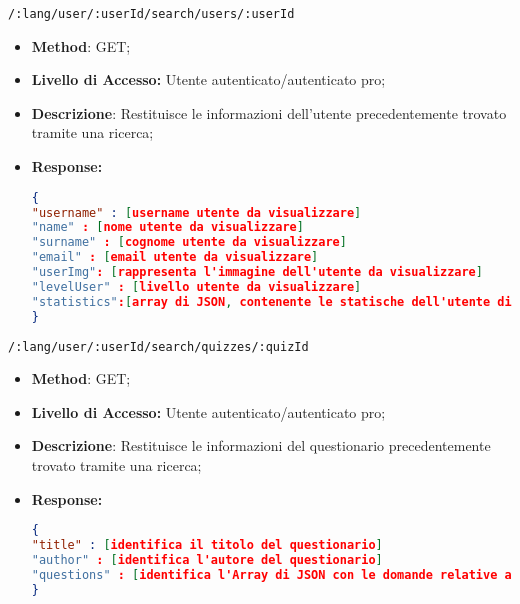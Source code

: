 	\item \texttt{/:lang/user/:userId/search/users/:userId}
	 \begin{itemize}
	 	\item \textbf{Method}: GET;
	 	\item \textbf{Livello di Accesso:} Utente autenticato/autenticato pro;
	 	\item \textbf{Descrizione}: Restituisce le informazioni dell'utente precedentemente trovato tramite una ricerca;
	 	\item \textbf{Response:} 
\begin{lstlisting}[language=json,firstnumber=1]
{
"username" : [username utente da visualizzare]
"name" : [nome utente da visualizzare]
"surname" : [cognome utente da visualizzare]
"email" : [email utente da visualizzare]
"userImg": [rappresenta l'immagine dell'utente da visualizzare]
"levelUser" : [livello utente da visualizzare]
"statistics":[array di JSON, contenente le statische dell'utente di ogni argomento]
}
\end{lstlisting}
	 \end{itemize}
	 
	 
	\item \texttt{/:lang/user/:userId/search/quizzes/:quizId}
	\begin{itemize}
		\item \textbf{Method}: GET;
		\item \textbf{Livello di Accesso:} Utente autenticato/autenticato pro;
		\item \textbf{Descrizione}: Restituisce le informazioni del questionario precedentemente trovato tramite una ricerca;
		\item \textbf{Response:} 
\begin{lstlisting}[language=json,firstnumber=1]
{
"title" : [identifica il titolo del questionario]
"author" : [identifica l'autore del questionario]
"questions" : [identifica l'Array di JSON con le domande relative al questionario]
}
\end{lstlisting}
	\end{itemize}
